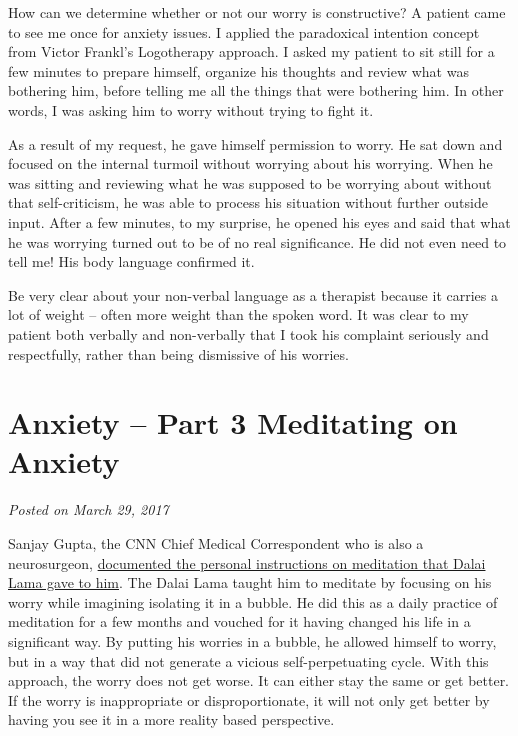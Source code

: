 \documentclass[]{book}
\begin{document}
How can we determine whether or not our worry is constructive? A patient came to see me once for anxiety issues. I applied the paradoxical intention concept from Victor Frankl's Logotherapy approach. I asked my patient to sit still for a few minutes to prepare himself, organize his thoughts and review what was bothering him, before telling me all the things that were bothering him. In other words, I was asking him to worry without trying to fight it.

As a result of my request, he gave himself permission to worry. He sat down and focused on the internal turmoil without worrying about his worrying. When he was sitting and reviewing what he was supposed to be worrying about without that self-criticism, he was able to process his situation without further outside input. After a few minutes, to my surprise, he opened his eyes and said that what he was worrying turned out to be of no real significance. He did not even need to tell me! His body language confirmed it.

Be very clear about your non-verbal language as a therapist because it carries a lot of weight -- often more weight than the spoken word. It was clear to my patient both verbally and non-verbally that I took his complaint seriously and respectfully, rather than being dismissive of his worries.

\hypertarget{anxiety-part-3-meditating-on-anxiety}{%
\section{Anxiety -- Part 3 Meditating on Anxiety}\label{anxiety-part-3-meditating-on-anxiety}}

\emph{Posted on March 29, 2017}

Sanjay Gupta, the CNN Chief Medical Correspondent who is also a neurosurgeon, \href{http://www.cnn.com/2017/02/15/health/sanjay-gupta-dalai-lama-meditation/?ref=yfp}{documented the personal instructions on meditation that Dalai Lama gave to him}. The Dalai Lama taught him to meditate by focusing on his worry while imagining isolating it in a bubble. He did this as a daily practice of meditation for a few months and vouched for it having changed his life in a significant way. By putting his worries in a bubble, he allowed himself to worry, but in a way that did not generate a vicious self-perpetuating cycle. With this approach, the worry does not get worse. It can either stay the same or get better. If the worry is inappropriate or disproportionate, it will not only get better by having you see it in a more reality based perspective.
\end{document}
